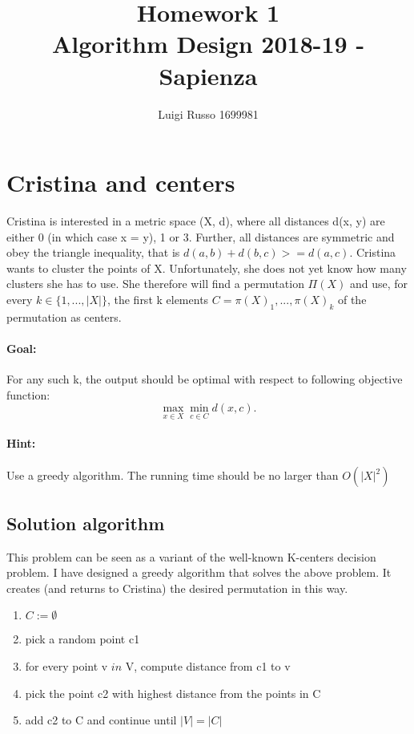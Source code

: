 \documentclass[12pt]{article}
\title{Homework 1\\
	\large Algorithm Design 2018-19 - Sapienza}
\author{Luigi Russo 1699981}
\begin{document}
	
\maketitle

\section{Cristina and centers}
Cristina is interested in a metric space (X, d), where all distances d(x, y) are
either 0 (in which case x = y), 1 or 3. Further, all distances are symmetric and obey the triangle inequality, that is $d(a, b) + d(b, c) >= d(a, c)$. Cristina wants to cluster the points of X. Unfortunately, she does not yet know how many clusters she has to use. She therefore will find a permutation $\Pi(X)$ and use, for every $k \in \{1, ..., |X|\}$, the first k elements $C =
{\pi(X)_1, ..., \pi(X)_k}$ of the permutation as centers.
\paragraph*{Goal:} For any such k, the output should be optimal with respect to following objective function:
\begin{equation}
\max_{x \in X} \min_{c \in C} d(x,c).
\end{equation}
\paragraph*{Hint:} Use a greedy algorithm. The running time should be no larger than $O(|X|^2)$

\subsection*{Solution algorithm}
This problem can be seen as a variant of the well-known K-centers decision problem. I have designed a greedy algorithm that solves the above problem.
It creates (and returns to Cristina) the desired permutation in this way.
\begin{enumerate}
	\item $C:= \emptyset$
	\item pick a random point c1
	\item for every point v $in$ V, compute distance from c1 to v 
	\item pick the point c2 with highest distance from the points in C
	\item add c2 to C and continue until $|V| = |C|$
\end{enumerate}
\end{document}
